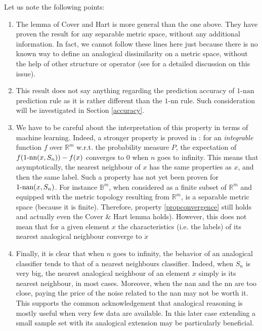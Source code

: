 {Let us note the following points:
\begin{enumerate}
\item The lemma of Cover and Hart is more general than the one above. They have
  proven the result for any separable metric space, without any additional
  information. In fact, we cannot follow these lines here just because there is
  no known way to define an analogical dissimilarity on a metric space, without
  the help of other structure or operator (see \cite{MicBayDelJAIR08} for a
  detailed discussion on this issue).
\item This result does not say anything regarding the prediction accuracy of
  $1\mbox{-nan}$ prediction rule as it is rather different than the
  $1\mbox{-nn}$ rule. Such consideration will be investigated in Section
  \ref{accuracy}.
\item We have to be careful about the interpretation of this property in terms
  of machine learning. Indeed, a stronger property is proved in
  \cite{CovHarTIT67}: for an {\it integrable} function $f$  over $\mathbb{R}^m$
  w.r.t. the probability measure $P$, the expectation of
  $f(1\mbox{-nn}(x,S_n))- f(x)$ converges to 0 when $n$ goes to infinity.
  This means that asymptotically, the nearest neighbour of $x$ has the same
  properties as $x$, and then the same label. Such a property has not yet been
  proven for $1\mbox{-nan}(x, S_n)$.
  For instance $\mathbb{B}^m$, when considered as a finite
  subset of $\mathbb{R}^m$ and equipped with the metric topology resulting from
  $\mathbb{R}^m$, is a separable metric space (because it is finite).
  Therefore, property \ref{propconvergence} still holds and actually even the
  Cover \& Hart lemma holds). However, this does not mean that for a given
  element $x$ the characteristics (i.e. the labels) of its nearest analogical
  neighbour converge to $\dot{x}$
\item Finally, it is clear that when $n$ goes to infinity, the behavior of an
  analogical classifier tends to that of a nearest neighbours classifier.
  Indeed, when $S_n$ is very big, the nearest analogical neighbour of an
  element $x$ simply is its nearest neighbour, in most cases. Moreover, when
  the nan and the nn are too close, paying the price of the noise related to
  the nan may not be worth it. This supports the common acknowledgement that
  analogical reasoning is mostly useful when very few data are available.
    In this later case extending a small sample set with its analogical
    extension may be particularly beneficial.




\end{enumerate}}
